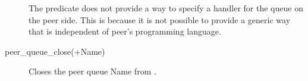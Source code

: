 \begin{description}
The predicate does not provide a way to specify a handler for the queue on
the peer side. This is because it is not possible to provide a generic
way that is independent of peer's programming language.

\item[\index{peer_queue_close/1}peer_queue_close(+Name)] 
Closes the peer queue Name from {\eclipse}. 

\end{description}




